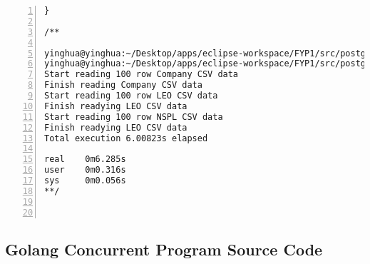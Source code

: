 \begin{lstlisting}[breaklines, frame=single, numbers=left, caption={Golang Sequential Program Source Code}, label=commandline-02]
}

/**

yinghua@yinghua:~/Desktop/apps/eclipse-workspace/FYP1/src/postgres-process$ go build sequential-read-csv.go
yinghua@yinghua:~/Desktop/apps/eclipse-workspace/FYP1/src/postgres-process$ time go run sequential-read-csv.go
Start reading 100 row Company CSV data
Finish reading Company CSV data
Start reading 100 row LEO CSV data
Finish readying LEO CSV data
Start reading 100 row NSPL CSV data
Finish readying LEO CSV data
Total execution 6.00823s elapsed

real	0m6.285s
user	0m0.316s
sys		0m0.056s
**/



\end{lstlisting}

\subsection {Golang Concurrent Program Source Code}

